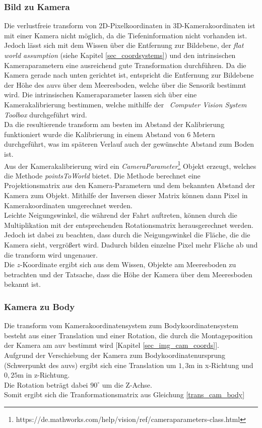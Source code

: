 \subsubsection{Bild zu Kamera}
\label{section_PicToCam}
Die verlustfreie \gls{transform} von 2D-Pixelkoordinaten in 3D-Kamerakoordinaten ist mit einer Kamera nicht möglich, da die Tiefeninformation nicht vorhanden ist. Jedoch lässt sich mit dem Wissen über die Entfernung zur Bildebene, der \textit{flat world assumption} (siehe Kapitel \ref{sec_coordsystems}) und den intrinsischen Kameraparametern eine ausreichend gute Transformation durchführen. Da die Kamera gerade nach unten gerichtet ist, entspricht die Entfernung zur Bildebene der Höhe des \gls{auv}s über dem Meeresboden, welche über die Sensorik bestimmt wird. Die intrinsischen Kameraparameter lassen sich über eine Kamerakalibrierung bestimmen, welche mithilfe der \matlab\ \textit{Computer Vision System Toolbox} durchgeführt wird.\\
Da die resultierende \gls{transform} am besten im Abstand der Kalibrierung funktioniert wurde die Kalibrierung in einem Abstand von 6 Metern durchgeführt, was im späteren Verlauf auch der gewünschte Abstand zum Boden ist.\\
Aus der Kamerakalibrierung wird ein \textit{CameraParameter}\footnote{https://de.mathworks.com/help/vision/ref/cameraparameters-class.html} Objekt erzeugt, welches die Methode \textit{pointsToWorld} bietet. Die Methode berechnet eine Projektionsmatrix aus den Kamera-Parametern und dem bekannten Abstand der Kamera zum Objekt. Mithilfe der Inversen dieser Matrix können dann Pixel in Kamerakoordinaten umgerechnet werden.\\
Leichte Neigungswinkel, die während der Fahrt auftreten, können durch die Multiplikation mit der entsprechenden Rotationsmatrix herausgerechnet werden. Jedoch ist dabei zu beachten, dass durch die Neigungswinkel die Fläche, die die Kamera sieht, vergrößert wird. Dadurch bilden einzelne Pixel mehr Fläche ab und die \gls{transform} wird ungenauer.\\
Die $z$-Koordinate ergibt sich aus dem Wissen, Objekte am Meeresboden zu betrachten und der Tatsache, dass die Höhe der Kamera über dem Meeresboden bekannt ist.

\subsubsection{Kamera zu Body}
Die \gls{transform} vom Kamerakoordinatensystem zum Bodykoordinatensystem besteht aus einer Translation und einer Rotation, die durch die Montageposition der Kamera am \gls{auv} bestimmt wird [Kapitel \ref{sec_img_cam_coords}].\\
Aufgrund der Verschiebung der Kamera zum Bodykoordinatenursprung (Schwerpunkt des \gls{auv}s) ergibt sich eine Translation um $1,3$m in x-Richtung und $0,25$m in z-Richtung.\\
Die Rotation beträgt dabei $90^\circ$ um die Z-Achse.\\
Somit ergibt sich die Tranformationsmatrix aus Gleichung \ref{trans_cam_body}\\

